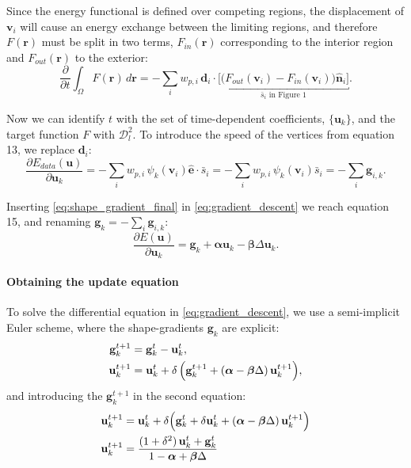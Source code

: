 \documentclass[a4paper]{report}
\renewcommand{\vec}[1]{\mathbf{#1}}
\begin{document}
Since the energy functional is defined over competing regions, the displacement of $\vec{v}_i$ will cause
  an energy exchange between the limiting regions, and therefore $F(\vec{r})$ must be split in
  two terms, $F_{in}(\vec{r})$ corresponding to the interior region and $F_{out}(\vec{r})$ to the exterior:
  \begin{equation}
  \frac{\partial}{\partial t} \int_\Omega F(\vec{r}) \, d\vec{r} =
  - \underset{i}{\sum} w_{p,i} \, \vec{d}_i \cdot
  \underbracket{\Big[ \big(F_{out}(\vec{v}_i) - F_{in}(\vec{v}_i) \big) \hat{\vec{n}}_i \Big]}_{\bar{s}_i \text{ in Figure 1}}.
  \label{eq:shape_gradient_disc2}
  \end{equation}

Now we can identify $t$ with the set of time-dependent coefficients, $\{\vec{u}_k\}$, and the target function $F$ with $\mathcal{D}_l^2$.
To introduce the speed of the vertices from equation 13, we replace $\vec{d}_i$:
\begin{equation}
  \frac{\partial E_{data}(\vec{u})}{\partial \vec{u}_k} =
  - \underset{i}{\sum} w_{p,i} \, \psi_k(\vec{v}_i) \hat{\vec{e}} \cdot \bar{s}_i =
  - \underset{i}{\sum} w_{p,i} \, \psi_k(\vec{v}_i) \bar{s}_i = - \underset{i}{\sum} \vec{g}_{i,k}.
  \label{eq:shape_gradient_final}
\end{equation}

Inserting \eqref{eq:shape_gradient_final} in \eqref{eq:gradient_descent} we reach equation 15,
  and renaming $\vec{g}_k = - \underset{i}{\sum} \vec{g}_{i,k}$:
  \begin{equation}
  \frac{\partial E(\vec{u})}{\partial \vec{u}_k} =
  \vec{g}_k + \boldsymbol{\alpha} \vec{u}_k
  -\boldsymbol{\beta} \Delta \vec{u}_k.
  \label{eq:gradient_final}
  \end{equation}


\paragraph{Obtaining the update equation} To solve the differential equation in \eqref{eq:gradient_descent},
  we use a semi-implicit Euler scheme, where the shape-gradients $\vec{g}_k$ are explicit:
\begin{align}
  \vec{g}_k^{t+1} &= \vec{g}_k^{t} - \vec{u}_k^{t}, \notag \\
  \vec{u}_k^{t+1} &= \vec{u}_k^{t} + \delta \, \Big( \vec{g}_k^{t+1} + (\boldsymbol{\alpha} - \boldsymbol{\beta} \Delta) \, \vec{u}_k^{t+1} \Big),
  \label{eq:semiimplicit_euler}
\end{align}
and introducing the $\vec{g}_k^{t+1}$ in the second equation:
\begin{align}
  \vec{u}_k^{t+1} &= \vec{u}_k^{t} + \delta \Big( \vec{g}_k^{t} + \delta \vec{u}_k^t + (\boldsymbol{\alpha} - \boldsymbol{\beta} \Delta) \, \vec{u}_k^{t+1} \Big) \notag \\
  \vec{u}_k^{t+1} &= \frac{ (1+\delta^2) \, \vec{u}_k^{t} + \vec{g}_k^{t}} {1 - \boldsymbol{\alpha} + \boldsymbol{\beta} \Delta}
  \label{eq:discrete_derivative}
\end{align}
\end{document}
